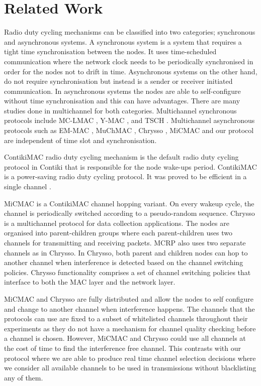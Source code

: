\section{Related Work}
\label{sec:relatedwork}
Radio duty cycling mechanisms can be classified into two categories; synchronous and asynchronous systems. A synchronous system is a system that requires a tight time synchronisation between the nodes. It uses time-scheduled communication where the network clock needs to be periodically synchronised in order for the nodes not to drift in time. Asynchronous systems on the other hand, do not require synchronisation but instead is a sender or receiver initiated communication. In asynchronous systems the nodes are able to self-configure without time synchronisation and this can have advantages. There are many studies done in multichannel for both categories. Multichannel synchronous protocols include MC-LMAC \cite{mc-lmac}, Y-MAC \cite{y-mac}, and TSCH \cite{tsch}. Multichannel asynchronous protocols such as EM-MAC \cite{emmac}, MuChMAC \cite{muchmac}, Chrysso \cite{chrysso}, MiCMAC \cite{micmac} and our protocol are independent of time slot and synchronisation. 

ContikiMAC \cite{contikimac} radio duty cycling mechanism is the default radio duty cycling protocol in Contiki that is responsible for the node wake-ups period. ContikiMAC is a power-saving radio duty cycling protocol. It was proved to be efficient in a single channel \cite{micmac,orpl}.

MiCMAC \cite{micmac} is a ContikiMAC \cite{contikimac} channel hopping variant. On every wakeup cycle, the channel is periodically switched according to a pseudo-random sequence. Chrysso \cite{chrysso} is a multichannel protocol for data collection applications. The nodes are organised into parent-children groups where each parent-children uses two channels for transmitting and receiving packets. MCRP also uses two separate channels as in Chrysso. In Chrysso, both parent and children nodes can hop to another channel when interference is detected based on the channel switching policies. Chrysso functionality comprises a set of channel switching policies that interface to both the MAC layer and the network layer. 

MiCMAC and Chrysso are fully distributed and allow the nodes to self configure and change to another channel when interference happens. The channels that the protocols can use are fixed to a subset of whitelisted channels throughout their experiments as they do not have a mechanism for channel quality checking before a channel is chosen. However, MiCMAC and Chrysso could use all channels at the cost of time to find the interference free channel. This contrasts with our protocol where we are able to produce real time channel selection decisions where we consider all available channels to be used in transmissions without blacklisting any of them. 

